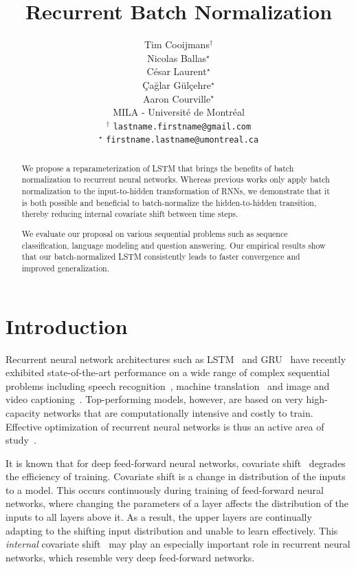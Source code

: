 \documentclass{article} %
\title{Recurrent Batch Normalization}
\author{
Tim Cooijmans$^\dagger$ \\
\And
Nicolas Ballas$^\star$ \\
\And
C\'esar Laurent$^\star$ \\
\And
Çağlar Gülçehre$^\star$ \\
\And
Aaron Courville$^\star$\\
MILA - Universit\'e de Montr\'eal\\
$^\dagger$ \texttt{lastname.firstname@gmail.com} \\
$^\star$ \texttt{firstname.lastname@umontreal.ca} \\
}
\begin{document}
\maketitle

\begin{abstract}
We propose a reparameterization of LSTM that brings the benefits of batch normalization to recurrent neural networks.
Whereas previous works only apply batch normalization to the input-to-hidden transformation of RNNs,
we demonstrate that it is both possible and beneficial to batch-normalize the hidden-to-hidden transition,
thereby reducing internal covariate shift between time steps.

We evaluate our proposal on various sequential problems such as sequence classification, language modeling and question answering.
Our empirical results show that our batch-normalized LSTM consistently leads to faster convergence and improved generalization.
\end{abstract}

\section{Introduction}

Recurrent neural network architectures such as LSTM~\cite{lstm} and GRU~\cite{cho2014learning} have recently exhibited
state-of-the-art performance on a wide range of complex sequential problems including speech recognition~\cite{baidu},
machine translation~\cite{bahdanau2014neural} and image and video captioning~\cite{xu2015show,yao2015describing}.
Top-performing models, however, are based on very high-capacity networks that are computationally intensive and costly to train.
Effective optimization of recurrent neural networks is thus an active area of study~\cite{pascanudifficulty,hessianfree,ollivier}.

It is known that for deep feed-forward neural networks, covariate shift~\cite{shimodaira2000improving,batchnorm}
degrades the efficiency of training.
Covariate shift is a change in distribution of the inputs to a model.
This occurs continuously during training of feed-forward neural networks,
where changing the parameters of a layer affects the distribution of the inputs to all layers above it.
As a result, the upper layers are continually adapting to the shifting input distribution and unable to learn effectively.
This \emph{internal} covariate shift~\cite{batchnorm} may play an especially important role in recurrent neural networks,
which resemble very deep feed-forward networks.
\end{document}

